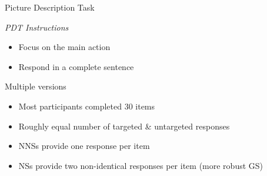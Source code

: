 \documentclass[final,14pt,t]{beamer}
\begin{document}
\begin{frame}{}
\begin{columns}[t]
\begin{column}{.33\linewidth}
\begin{minipage}[t][\textheight]{\linewidth}
\begin{block}{Picture Description Task}
\begin{center}
\begin{minipage}{.85\textwidth}
\vspace{.6em}
  \textit{PDT Instructions}
    \begin{itemize}
    \item Focus on the main action
    \item Respond in a complete sentence
    \end{itemize}

\vspace{.6em}
Multiple versions
	\begin{itemize}
		\item Most participants completed 30 items
		\item Roughly equal number of targeted \& untargeted responses %
		\item NNSs provide one response per item
		\item NSs provide two non-identical responses per item (more robust GS)
	\end{itemize}



\end{minipage}
\end{center}
\end{block}
\end{minipage}
\end{column}
\end{columns}
\end{frame}
\end{document}
